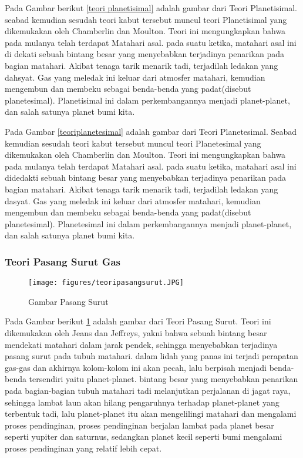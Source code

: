 	Pada Gambar berikut \ref{teori planetisimal} adalah gambar dari Teori Planetisimal.
seabad kemudian sesudah teori kabut tersebut muncul teori Planetisimal yang dikemukakan oleh Chamberlin dan Moulton. Teori ini mengungkapkan bahwa pada mulanya telah terdapat Matahari asal. pada suatu ketika, matahari asal ini di dekati sebuah bintang besar yang menyebabkan terjadinya penarikan pada bagian matahari. Akibat tenaga tarik menarik tadi, terjadilah ledakan yang dahsyat. Gas yang meledak ini keluar dari atmosfer matahari, kemudian mengembun dan membeku sebagai benda-benda yang padat(disebut planetesimal). Planetisimal ini dalam perkembangannya menjadi planet-planet, dan salah satunya planet bumi kita.


Pada Gambar \ref{teoriplanetesimal} adalah gambar dari Teori Planetesimal. Seabad kemudian sesudah teori kabut tersebut muncul teori Planetesimal yang dikemukakan oleh Chamberlin dan Moulton. Teori ini mengungkapkan bahwa pada mulanya telah terdapat Matahari asal. pada suatu ketika, matahari asal ini didedakti sebuah bintang besar yang menyebabkan terjadinya penarikan pada bagian matahari. Akibat tenaga tarik menarik tadi, terjadilah ledakan yang dasyat. Gas yang meledak ini keluar dari atmosfer matahari, kemudian mengembun dan membeku sebagai benda-benda yang padat(disebut planetesimal). Planetesimal ini dalam perkembangannya menjadi planet-planet, dan salah satunya planet bumi kita.

\subsubsection{Teori Pasang Surut Gas}
\begin{figure} [ht]
	\centerline{\texttt{[image: figures/teoripasangsurut.JPG]}}
	\caption{Gambar Pasang Surut}
	\label{teori pasang surut}
	\end{figure}

	Pada Gambar berikut \ref{teori pasang surut} adalah gambar dari Teori Pasang Surut.
Teori ini dikemukakan oleh Jeans dan Jeffreys, yakni bahwa sebuah bintang besar mendekati matahari dalam jarak pendek, sehingga menyebabkan terjadinya pasang surut pada tubuh matahari. dalam lidah yang panas ini terjadi perapatan gas-gas dan akhirnya kolom-kolom ini akan pecah, lalu berpisah menjadi benda-benda tersendiri yaitu planet-planet. bintang besar yang menyebabkan penarikan pada bagian-bagian tubuh matahari tadi melanjutkan perjalanan di jagat raya, sehingga lambat laun akan hilang pengaruhnya terhadap planet-planet yang terbentuk tadi, lalu planet-planet itu akan mengelilingi matahari dan mengalami proses pendinginan, proses pendinginan berjalan lambat pada planet besar seperti yupiter dan saturnus, sedangkan planet kecil seperti bumi mengalami proses pendinginan yang relatif lebih cepat.


